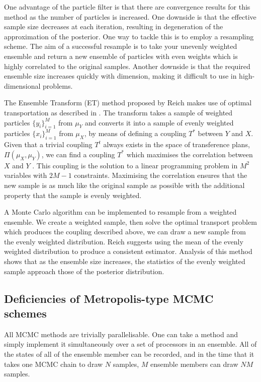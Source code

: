 \documentclass[final]{siamltex}
\begin{document}
One advantage of the particle filter is that there are convergence
results for this method as the number of particles is increased. One
downside is that the effective sample size decreases at each
iteration, resulting in degeneration of the approximation of the
posterior. One way to tackle
this is to employ a resampling scheme. The aim of a successful
resample is to take your unevenly weighted ensemble and return a new
ensemble of particles with even weights which is highly correlated to
the original samples. Another downside is that the required ensemble
size increases quickly with dimension, making it difficult to use in
high-dimensional problems.

The Ensemble Transform (ET) method proposed by Reich \cite{reich2013nonparametric} makes use of optimal transportation as described in \cite{villani2003topics,villani2008optimal}. The transform takes a sample of weighted particles $\{y_i\}_{i=1}^M$ from $\mu_Y$ and converts it into a sample of evenly weighted particles $\{x_i\}_{i=1}^M$ from $\mu_X$, by means of defining a coupling $T^*$ between $Y$ and $X$. Given that a trivial coupling $T^t$ always exists in the space of transference plans, $\Pi(\mu_{X}, \mu_{Y})$, we can find a coupling $T^*$ which maximises the correlation between $X$ and $Y$ \cite{cotter2012ensemble}. This coupling is the solution to a linear programming problem in $M^2$ variables with $2M-1$ constraints. Maximising the correlation ensures that the new sample is as much like the original sample as possible with the additional property that the sample is evenly weighted.

A Monte Carlo algorithm can be implemented to resample from a weighted
ensemble. We create a weighted sample, then solve the optimal
transport problem which produces the coupling described above, we can
draw a new sample from the evenly weighted distribution. Reich
suggests using the mean of the evenly weighted distribution to produce
a consistent estimator. Analysis of this method shows that as the
ensemble size increases, the statistics of the evenly weighted sample
approach those of the posterior distribution.

\subsection{Deficiencies of Metropolis-type MCMC schemes}
All MCMC methods are trivially parallelisable. One can take a method
and simply implement it simultaneously over a set of processors in an ensemble. All
of the states of all of the ensemble member can be recorded, and in the time
that it takes one MCMC chain to draw $N$ samples, $M$ ensemble members
can draw
$NM$ samples. 
\end{document}

